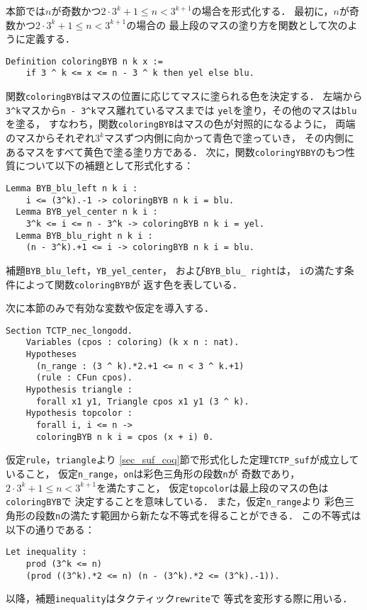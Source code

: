 本節では$n$が奇数かつ$2 \cdot 3^{k} + 1 \leq n < 3^{k+1}$の場合を形式化する．
最初に，$n$が奇数かつ$2 \cdot 3^{k} + 1 \leq n < 3^{k+1}$の場合の
最上段のマスの塗り方を関数として次のように定義する．
\begin{lstlisting}[language=Coq]
  Definition coloringBYB n k x :=
    if 3 ^ k <= x <= n - 3 ^ k then yel else blu.
\end{lstlisting}
関数{\tt{coloringBYB}}はマスの位置に応じてマスに塗られる色を決定する．
左端から{\tt{3\verb|^|k}}マスから{\tt{n - 3\verb|^|k}}マス離れているマスまでは
{\tt{yel}}を塗り，その他のマスは{\tt{blu}}を塗る，
すなわち，関数{\tt{coloringBYB}}はマスの色が対照的になるように，
両端のマスからそれぞれ$3^k$マスずつ内側に向かって青色で塗っていき，
その内側にあるマスをすべて黄色で塗る塗り方である．
次に，関数{\tt{coloringYBBY}}のもつ性質について以下の補題として形式化する：
\begin{lstlisting}[language=Coq]
  Lemma BYB_blu_left n k i :
    i <= (3^k).-1 -> coloringBYB n k i = blu.
  Lemma BYB_yel_center n k i :
    3^k <= i <= n - 3^k -> coloringBYB n k i = yel.
  Lemma BYB_blu_right n k i :
    (n - 3^k).+1 <= i -> coloringBYB n k i = blu.
\end{lstlisting}
補題{\tt{BYB\_blu\_left}}，{\tt{YB\_yel\_center}}，
および{\tt{BYB\_blu\_ right}}は，
{\tt{i}}の満たす条件によって関数{\tt{coloringBYB}}が
返す色を表している．

次に本節のみで有効な変数や仮定を導入する．
\begin{lstlisting}[language=Coq]
  Section TCTP_nec_longodd.
    Variables (cpos : coloring) (k x n : nat).
    Hypotheses
      (n_range : (3 ^ k).*2.+1 <= n < 3 ^ k.+1)
      (rule : CFun cpos).
    Hypothesis triangle :
      forall x1 y1, Triangle cpos x1 y1 (3 ^ k).
    Hypothesis topcolor :
      forall i, i <= n ->
      coloringBYB n k i = cpos (x + i) 0.
\end{lstlisting}
仮定{\tt{rule}}，{\tt{triangle}}より
\ref{sec_suf_coq}節で形式化した定理{\tt{TCTP\_suf}}が成立していること，
仮定{\tt{n\_range}}，{\tt{on}}は彩色三角形の段数{\tt{n}}が
奇数であり，$2 \cdot 3^{k} + 1 \leq n < 3^{k+1}$を満たすこと，
仮定{\tt{topcolor}}は最上段のマスの色は{\tt{coloringBYB}}で
決定することを意味している．
また，仮定{\tt{n\_range}}より
彩色三角形の段数{\tt{n}}の満たす範囲から新たな不等式を得ることができる．
この不等式は以下の通りである：
\begin{lstlisting}[language=Coq]
  Let inequality :
    prod (3^k <= n)
    (prod ((3^k).*2 <= n) (n - (3^k).*2 <= (3^k).-1)).
\end{lstlisting}
以降，補題{\tt{inequality}}はタクティック{\tt{rewrite}}で
等式を変形する際に用いる．

